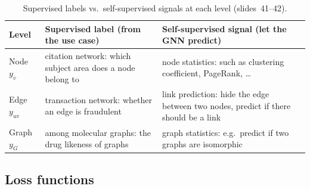 \begin{table}[htbp]
  \centering\small
  \caption{Supervised labels vs.\ self-supervised signals at each level
  (slides~41--42).}
  \label{tab:lec05-labels}
  \renewcommand{\arraystretch}{1.2}
  \begin{tabularx}{\textwidth}{@{}l>{\raggedright\arraybackslash}X>{\raggedright\arraybackslash}X@{}}
    \toprule
    Level & Supervised label (from the use case) & Self-supervised signal (let
      the GNN predict)\\
    \midrule
    Node $y_v$ & citation network: which subject area does a node belong to
      & node statistics: such as clustering coefficient, PageRank, \dots\\
    Edge $y_{uv}$ & transaction network: whether an edge is fraudulent
      & link prediction: hide the edge between two nodes, predict if there
      should be a link\\
    Graph $y_G$ & among molecular graphs: the drug likeness of graphs
      & graph statistics: e.g.\ predict if two graphs are isomorphic\\
    \bottomrule
  \end{tabularx}
\end{table}

\subsection{Loss functions}\label{sec:lec05-loss}


